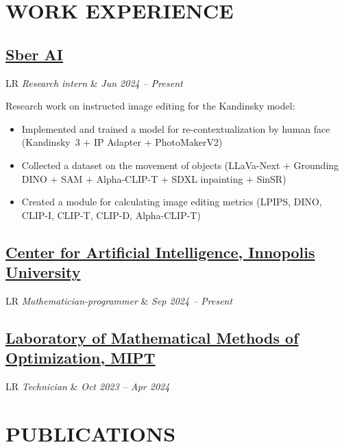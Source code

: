 \documentclass[11pt,a4paper]{moderncv}
\newcommand*{\experienceentry}[4][1.5mm]{
    \subsection{#2} \vspace{-1.5mm}
    \begin{tabularx}{\textwidth}{LR}
        {\itshape #3} & {\itshape #4}
    \end{tabularx}
    \par\addvspace{#1}
}
\begin{document}
\maketitle
\vspace{-1cm}

\begin{minipage}[t]{0.62\textwidth}

\section{WORK EXPERIENCE}
\experienceentry{\href{https://ai.sber.ru/en/about}{Sber AI}}{Research intern}{Jun 2024 -- Present}{
    Research work on instructed image editing for the Kandinsky model:
    \begin{itemize}
        \item Implemented and trained a model for re-contextualization by human face (Kandinsky~3 + IP Adapter + PhotoMakerV2)
        \item Collected a dataset on the movement of objects (LLaVa-Next + Grounding DINO + SAM + Alpha-CLIP-T + SDXL inpainting + SinSR)
        \item Created a module for calculating image editing metrics (LPIPS, DINO, CLIP-I, CLIP-T, CLIP-D, Alpha-CLIP-T)
    \end{itemize}
}
\experienceentry{\href{https://innopolis.university/en/centerforartificialintelligence/}{Center for Artificial Intelligence, Innopolis University}}{Mathematician-programmer}{Sep 2024 -- Present}
\experienceentry{\href{https://labmmo.ru/en}{Laboratory of Mathematical Methods of Optimization, MIPT}}{Technician}{Oct 2023 -- Apr 2024}

\section{PUBLICATIONS}


\end{minipage}
\end{document}
